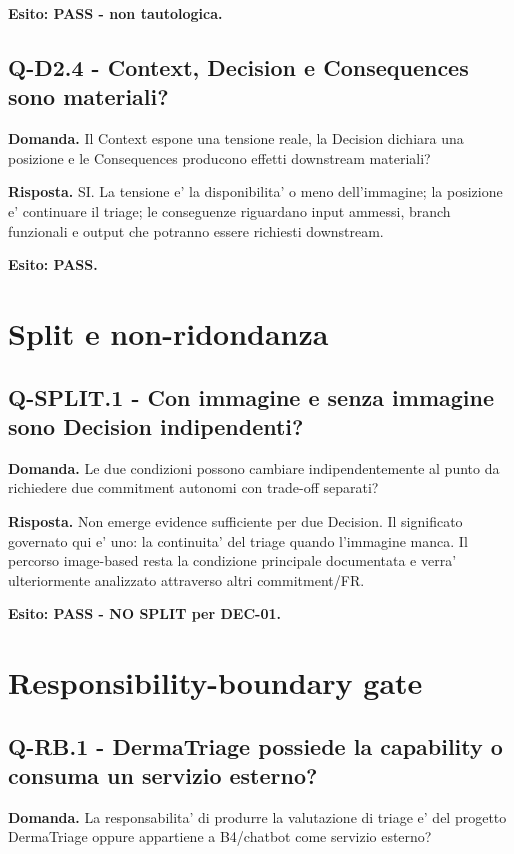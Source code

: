 \documentclass[11pt,a4paper]{article}
\begin{document}
\textbf{Esito: PASS - non tautologica.}

\subsection{Q-D2.4 - Context, Decision e Consequences sono materiali?}
\begin{ddtacheck}
\textbf{Domanda.} Il Context espone una tensione reale, la Decision dichiara una posizione e le Consequences producono effetti downstream materiali?
\end{ddtacheck}

\textbf{Risposta.} SI. La tensione e' la disponibilita' o meno dell'immagine; la posizione e' continuare il triage; le conseguenze riguardano input ammessi, branch funzionali e output che potranno essere richiesti downstream.

\textbf{Esito: PASS.}

\section{Split e non-ridondanza}

\subsection{Q-SPLIT.1 - Con immagine e senza immagine sono Decision indipendenti?}
\begin{ddtacheck}
\textbf{Domanda.} Le due condizioni possono cambiare indipendentemente al punto da richiedere due commitment autonomi con trade-off separati?
\end{ddtacheck}

\textbf{Risposta.} Non emerge evidence sufficiente per due Decision. Il significato governato qui e' uno: la continuita' del triage quando l'immagine manca. Il percorso image-based resta la condizione principale documentata e verra' ulteriormente analizzato attraverso altri commitment/FR.

\textbf{Esito: PASS - NO SPLIT per DEC-01.}

\section{Responsibility-boundary gate}

\subsection{Q-RB.1 - DermaTriage possiede la capability o consuma un servizio esterno?}
\begin{ddtacheck}
\textbf{Domanda.} La responsabilita' di produrre la valutazione di triage e' del progetto DermaTriage oppure appartiene a B4/chatbot come servizio esterno?
\end{ddtacheck}
\end{document}
